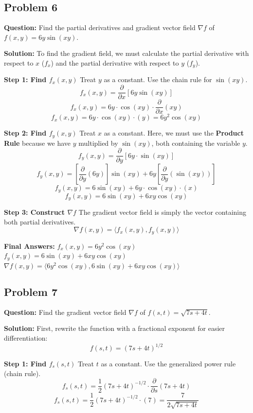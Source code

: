 \documentclass[11pt]{article}
\begin{document}
\subsection*{Problem 6}
\textbf{Question:} Find the partial derivatives and gradient vector field $\nabla f$ of $f(x, y) = 6y \sin(xy)$.

\textbf{Solution:}
To find the gradient field, we must calculate the partial derivative with respect to $x$ ($f_x$) and the partial derivative with respect to $y$ ($f_y$).

\textbf{Step 1: Find $f_x(x, y)$}
Treat $y$ as a constant. Use the chain rule for $\sin(xy)$.
\[ f_x(x, y) = \frac{\partial}{\partial x} [6y \sin(xy)] \]
\[ f_x(x, y) = 6y \cdot \cos(xy) \cdot \frac{\partial}{\partial x}(xy) \]
\[ f_x(x, y) = 6y \cdot \cos(xy) \cdot (y) = 6y^2 \cos(xy) \]

\textbf{Step 2: Find $f_y(x, y)$}
Treat $x$ as a constant. Here, we must use the \textbf{Product Rule} because we have $y$ multiplied by $\sin(xy)$, both containing the variable $y$.
\[ f_y(x, y) = \frac{\partial}{\partial y} [6y \cdot \sin(xy)] \]
\[ f_y(x, y) = \left[ \frac{\partial}{\partial y}(6y) \right] \sin(xy) + 6y \left[ \frac{\partial}{\partial y}(\sin(xy)) \right] \]
\[ f_y(x, y) = 6 \sin(xy) + 6y \cdot \cos(xy) \cdot (x) \]
\[ f_y(x, y) = 6 \sin(xy) + 6xy \cos(xy) \]

\textbf{Step 3: Construct $\nabla f$}
The gradient vector field is simply the vector containing both partial derivatives.
\[ \nabla f(x, y) = \langle f_x(x, y), f_y(x, y) \rangle \]

\textbf{Final Answers:}
$f_x(x, y) = 6y^2 \cos(xy)$ \\
$f_y(x, y) = 6\sin(xy) + 6xy \cos(xy)$ \\
$\nabla f(x, y) = \langle 6y^2 \cos(xy), 6\sin(xy) + 6xy \cos(xy) \rangle$

\subsection*{Problem 7}
\textbf{Question:} Find the gradient vector field $\nabla f$ of $f(s, t) = \sqrt{7s + 4t}$.

\textbf{Solution:}
First, rewrite the function with a fractional exponent for easier differentiation:
\[ f(s, t) = (7s + 4t)^{1/2} \]

\textbf{Step 1: Find $f_s(s, t)$}
Treat $t$ as a constant. Use the generalized power rule (chain rule).
\[ f_s(s, t) = \frac{1}{2}(7s + 4t)^{-1/2} \cdot \frac{\partial}{\partial s}(7s + 4t) \]
\[ f_s(s, t) = \frac{1}{2}(7s + 4t)^{-1/2} \cdot (7) = \frac{7}{2\sqrt{7s + 4t}} \]
\end{document}
